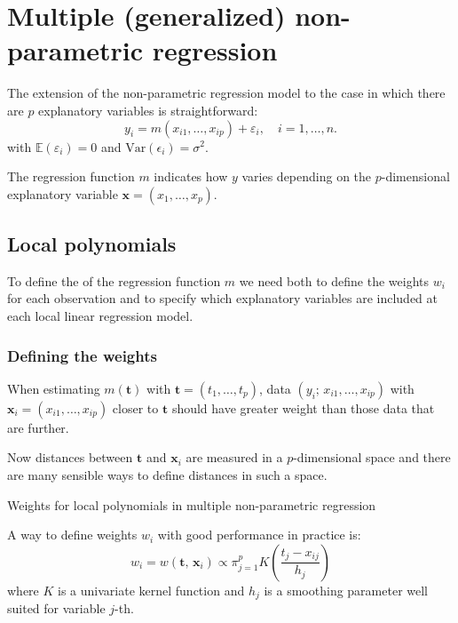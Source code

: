 \chapter[Multiple non-parametric regression]{Multiple (generalized) non-parametric regression}

The extension of the non-parametric regression model to the case in which there are
$p$ explanatory variables is straightforward:
\begin{equation*}
    y_i = m(x_{i1}, \ldots, x_{ip}) + \varepsilon_i, \quad i = 1, \ldots, n.
\end{equation*}
with $\mathds E(\varepsilon_i) = 0$ and $\text{Var}(\epsilon_i) = \sigma^2$.

The regression function $m$ indicates how $y$ varies depending on the
$p$-dimensional explanatory variable $\boldsymbol x = (x_1, \ldots, x_p)$.

\section{Local polynomials}
To define the  of the regression function $m$
we need both to define the weights $w_i$ for each observation and to specify
which explanatory variables are included at each local linear regression model.

\subsection{Defining the weights}

When estimating $m(\boldsymbol t)$ with $\boldsymbol t = (t_1, \ldots, t_p)$,
data $(y_i;\,x_{i1}, \ldots, x_{ip})$ with $\boldsymbol x_i = (x_{i1}, \ldots, x_{ip})$
closer to $\boldsymbol t$ should have greater weight than those
data that are further.

Now distances between $\boldsymbol t$ and $\boldsymbol x_i$ are measured in
a $p$-dimensional space and there are many sensible ways to define distances in 
such a space.

\begin{definition}{Weights for local polynomials in multiple non-parametric regression}{}

A way to define weights $w_i$ with good performance in practice is:
\begin{equation*}
    w_i = w(\boldsymbol t,\, \boldsymbol x_i) \propto \pi_{j=1}^p
    K\left(\frac{t_j - x_{ij}}{h_j}\right)
\end{equation*}
where $K$ is a univariate kernel function and $h_j$ is a smoothing parameter
well suited for variable $j$-th.
\end{definition}

